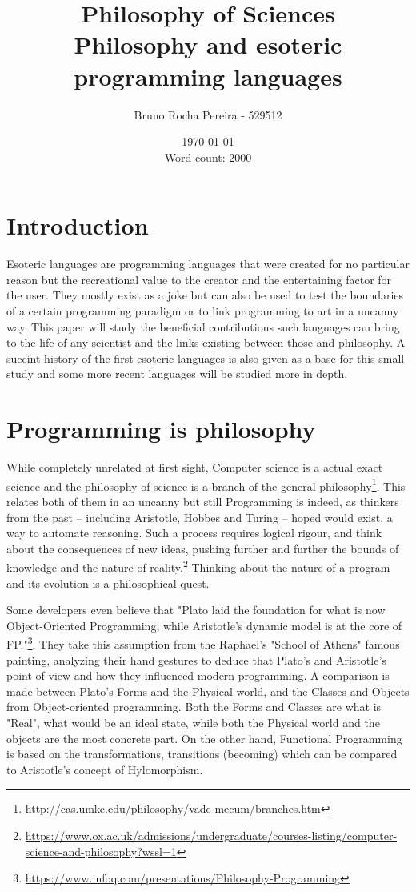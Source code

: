 \documentclass[4paper]{article}
\title{Philosophy of Sciences\\Philosophy and esoteric programming languages}
\author{Bruno Rocha Pereira - 529512}
\date{\today \\ \vspace{0.5cm}Word count: 2000}
\begin{document}
\maketitle
\section{Introduction}
Esoteric languages are programming languages that were created for no particular reason but the recreational value to the creator and the entertaining factor for the user. They mostly exist as a joke but can also be used to test the boundaries of a certain programming paradigm or to link programming to art in a uncanny way. This paper will study the beneficial contributions such languages can bring to the life of any scientist and the links existing between those and philosophy. A succint history of the first esoteric languages is also given as a base for this small study and some more recent languages will be studied more in depth.

\section{Programming is philosophy}
While completely unrelated at first sight, Computer science is a actual exact science and the philosophy of science is a branch of the general philosophy\footnote{\url{http://cas.umkc.edu/philosophy/vade-mecum/branches.htm}}. This relates both of them in an uncanny but still Programming is indeed, as thinkers from the past – including Aristotle, Hobbes and Turing – hoped would exist, a way to automate reasoning. Such a process requires logical rigour, and think about the consequences of new ideas, pushing further and further the bounds of knowledge and the nature of reality.\footnote{\url{https://www.ox.ac.uk/admissions/undergraduate/courses-listing/computer-science-and-philosophy?wssl=1}} Thinking about the nature of a program and its evolution is a philosophical quest.

Some developers even believe that "Plato laid the foundation for what is now Object-Oriented Programming, while Aristotle’s dynamic model is at the core of FP."\footnote{\url{https://www.infoq.com/presentations/Philosophy-Programming}}. They take this assumption from the Raphael's "School of Athens" famous painting, analyzing their hand gestures to deduce that Plato's and Aristotle's point of view and how they influenced modern programming. A comparison is made between Plato's Forms and the Physical world, and the Classes and Objects from Object-oriented programming. Both the Forms and Classes are what is "Real", what would be an ideal state, while both the Physical world and the objects are the most concrete part. On the other hand, Functional Programming is based on the transformations, transitions (becoming) which can be compared to Aristotle's concept of Hylomorphism. 
\end{document}
